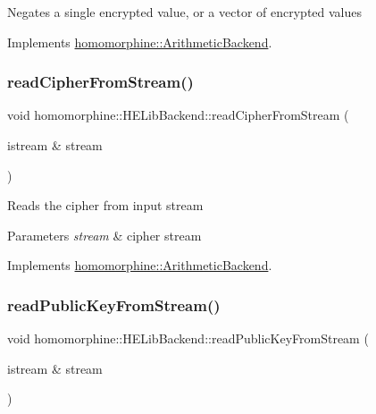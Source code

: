 Negates a single encrypted value, or a vector of encrypted values 

Implements \mbox{\hyperlink{classhomomorphine_1_1_arithmetic_backend_ad27913060534c42b5812a1e4cf21475f}{homomorphine\+::\+Arithmetic\+Backend}}.

\mbox{\label{classhomomorphine_1_1_h_e_lib_backend_a91b1a5b9baa1031addb9fce1e4a05ec0}} 
\subsubsection{\texorpdfstring{readCipherFromStream()}{readCipherFromStream()}}
{\footnotesize\ttfamily void homomorphine\+::\+H\+E\+Lib\+Backend\+::read\+Cipher\+From\+Stream (\begin{DoxyParamCaption}\item[{istream \&}]{stream }\end{DoxyParamCaption})\hspace{0.3cm}{\ttfamily [virtual]}}

Reads the cipher from input stream


\begin{DoxyParams}{Parameters}
{\em stream} & cipher stream \\
\hline
\end{DoxyParams}


Implements \mbox{\hyperlink{classhomomorphine_1_1_arithmetic_backend_ac8fe4568424c616b653a955b172c480b}{homomorphine\+::\+Arithmetic\+Backend}}.

\mbox{\label{classhomomorphine_1_1_h_e_lib_backend_a2b9f132cc4dde870db1e69553349813b}} 
\subsubsection{\texorpdfstring{readPublicKeyFromStream()}{readPublicKeyFromStream()}}
{\footnotesize\ttfamily void homomorphine\+::\+H\+E\+Lib\+Backend\+::read\+Public\+Key\+From\+Stream (\begin{DoxyParamCaption}\item[{istream \&}]{stream }\end{DoxyParamCaption})\hspace{0.3cm}{\ttfamily [virtual]}}

